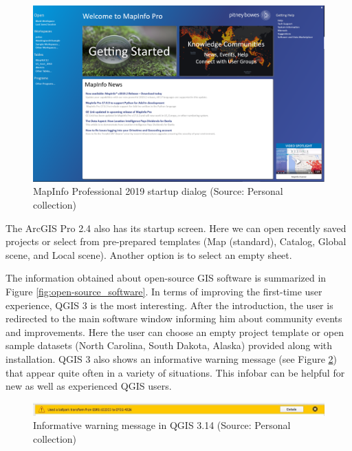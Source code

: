 \documentclass[a4paper,10pt,twoside]{article}
\begin{document}
\vspace{0.3cm}
\begin{figure}[hbt!] 
\begin{center}
\includegraphics[width=16cm]{../pictures/map_info_startup_screen.PNG} 
\caption[MapInfo Professional 2019 startup dialog]{MapInfo Professional 2019 startup dialog (Source: Personal collection)}
\label{fig:map_info_startup_screen}
\end{center}
\end{figure}

\noindent The ArcGIS Pro 2.4 also has its startup screen. Here we can open recently saved projects or select from pre-prepared templates (Map (standard), Catalog, Global scene, and Local scene). Another option is to select an empty sheet.

The information obtained about open-source GIS software is summarized in Figure \ref{fig:open-source_software}. In terms of improving the first-time user experience, QGIS 3 is the most interesting. After the introduction, the user is redirected to the main software window informing him about community events and improvements. Here the user can choose an empty project template or open sample datasets (North Carolina, South Dakota, Alaska) provided along with installation. QGIS 3 also shows an informative warning message (see Figure \ref{fig:qgis_warning_window}) that appear quite often in a variety of situations. This infobar can be helpful for new as well as experienced QGIS users.

\vspace{0.3cm}
\begin{figure}[hbt!] 
\begin{center}
\includegraphics[width=17cm]{../pictures/qgis_warning_window.JPG} 
\caption[Informative warning message  in QGIS 3.14]{Informative warning message  in QGIS 3.14 (Source: Personal collection)}
\label{fig:qgis_warning_window}
\end{center}
\end{figure}
\end{document}
